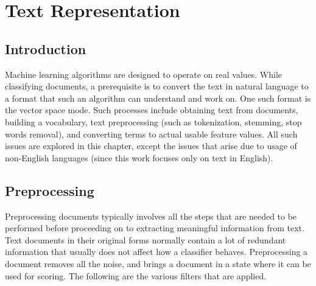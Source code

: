 \chapter{Text Representation}
\label{chapter:Text Representation}

\section{Introduction}
Machine learning algorithms are designed to operate on real values. While classifying documents, a prerequisite is to convert the text in natural language to a format that such an algorithm can understand and work on. One such format is the vector space mode. Such processes include obtaining text from documents, building a vocabulary, text preprocessing (such as tokenization, stemming, stop words removal), and converting terms to actual usable feature values. All such issues are explored in this chapter, except the issues that arise due to usage of non-English languages (since this work focuses only on text in English).

\section{Preprocessing}
Preprocessing documents typically involves all the steps that are needed to be performed before proceeding on to extracting meaningful information from text. Text documents in their original forms normally contain a lot of redundant information that usually does not affect how a classifier behaves. Preprocessing a document removes all the noise, and brings a document in a state where it can be used for scoring. The following are the various filters that are applied.

